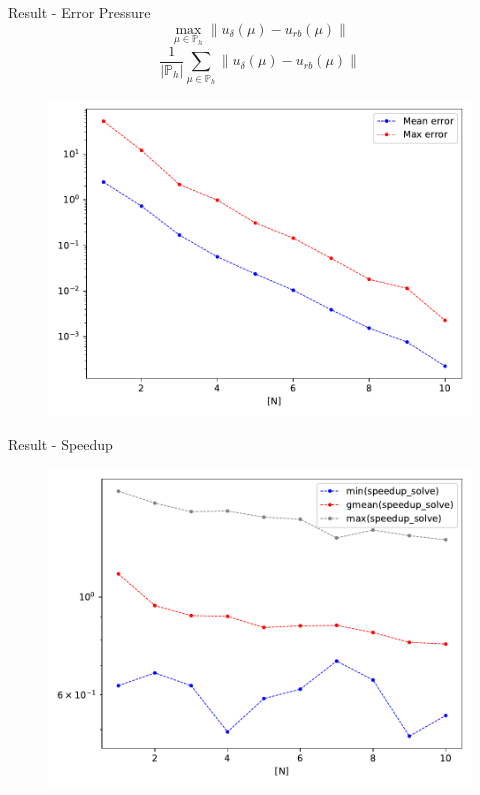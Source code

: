 \documentclass[9pt]{beamer}
\begin{document}
\begin{frame}{Result - Error Pressure}
$$\max_{\mu \in \mathbb{P}_h} \|u_{\delta}(\mu) - u_{rb}(\mu)\|$$
$$\frac{1}{|\mathbb{P}_h|} \sum_{\mu \in \mathbb{P}_h} \|u_{\delta}(\mu) - u_{rb}(\mu)\|$$
\begin{figure}
    \centering
    \includegraphics[height=0.55\paperheight]{output_error_p.pdf}
\end{figure}
\end{frame}

\begin{frame}{Result - Speedup}

\begin{figure}
    \centering
    \includegraphics[height=0.75\paperheight]{speedup_solve.pdf}
\end{figure}
\end{frame}
 
\end{document}
